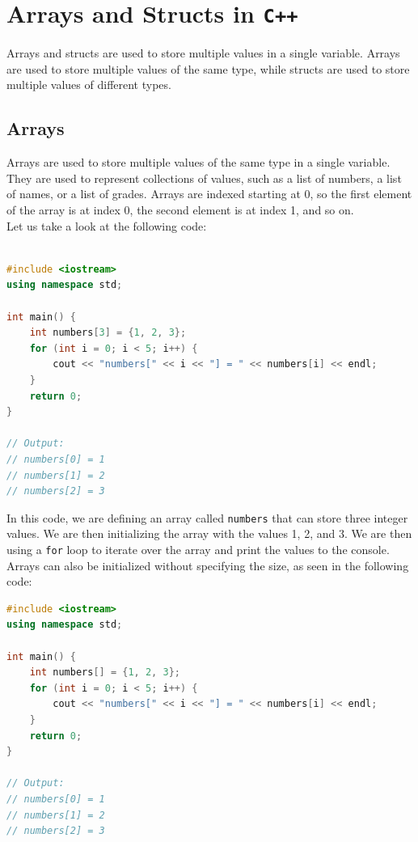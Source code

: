 \section{Arrays and Structs in \texttt{C++}}

Arrays and structs are used to store multiple values in a single variable. Arrays are used to store multiple values of the
same type, while structs are used to store multiple values of different types.\\

\subsection{Arrays}

Arrays are used to store multiple values of the same type in a single variable. They are used to represent collections of
values, such as a list of numbers, a list of names, or a list of grades. Arrays are indexed starting at 0, so the first
element of the array is at index 0, the second element is at index 1, and so on.\\

Let us take a look at the following code:

\begin{lstlisting}[language=C++]

#include <iostream>
using namespace std;

int main() {
    int numbers[3] = {1, 2, 3};
    for (int i = 0; i < 5; i++) {
        cout << "numbers[" << i << "] = " << numbers[i] << endl;
    }
    return 0;
}

// Output:
// numbers[0] = 1
// numbers[1] = 2
// numbers[2] = 3
\end{lstlisting}

In this code, we are defining an array called \texttt{numbers} that can store three integer values. We are then initializing
the array with the values 1, 2, and 3. We are then using a \texttt{for} loop to iterate over the array and print the values
to the console.\\

Arrays can also be initialized without specifying the size, as seen in the following code:

\begin{lstlisting}[language=C++]
#include <iostream>
using namespace std;

int main() {
    int numbers[] = {1, 2, 3};
    for (int i = 0; i < 5; i++) {
        cout << "numbers[" << i << "] = " << numbers[i] << endl;
    }
    return 0;
}

// Output:
// numbers[0] = 1
// numbers[1] = 2
// numbers[2] = 3
\end{lstlisting}

